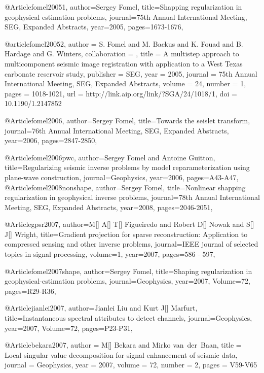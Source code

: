 @Article{fomel20051,
  author={Sergey Fomel},
  title={Shapping regularization in geophysical estimation problems},
  journal={75th Annual International Meeting, SEG, Expanded Abstracts},
  year=2005,
  pages={1673-1676},
}

@article{fomel20052,
author = {S. Fomel and M. Backus and K. Fouad and B. Hardage and G. Winters},
collaboration = {},
title = {A multistep approach to multicomponent seismic image
                  registration with application to a {W}est {T}exas
                  carbonate reservoir study},
publisher = {SEG},
year = {2005},
journal = {75th Annual International Meeting, SEG, Expanded Abstracts},
volume = {24},
number = {1},
pages = {1018-1021},
url = {http://link.aip.org/link/?SGA/24/1018/1},
doi = {10.1190/1.2147852}
}

@Article{fomel2006,
  author={Sergey Fomel},
  title={Towards the seislet transform},
  journal={76th Annual International Meeting, SEG, Expanded Abstracts},
  year=2006,
  pages={2847-2850},
}

@Article{fomel2006pwc,
  author={Sergey Fomel and Antoine Guitton},
  title={Regularizing seismic inverse problems by model reparameterization using plane-wave construction},
  journal={Geophysics},
  year=2006,
  pages={A43-A47},
}
@Article{fomel2008nonshape,
  author={Sergey Fomel},
  title={Nonlinear shapping regularization in geophysical inverse problems},
  journal={78th Annual International Meeting, SEG, Expanded Abstracts},
  year=2008,
  pages={2046-2051},
}

@Article{gpsr2007,
author={M[] A[] T[] Figueiredo and Robert D[] Nowak and S[] J[] Wright},
title={Gradient projection for sparse reconstruction: Application to compressed sensing and other inverse problems},
journal={IEEE journal of selected topics in signal processing},
volume=1,
year=2007,
pages={586 - 597},
}

@Article{fomel2007shape,
  author={Sergey Fomel},
  title={Shaping regularization in geophysical-estimation problems},
  journal={Geophysics},
  year=2007,
  Volume=72,
  pages={R29-R36},
}

@Article{jianlei2007,
  author={Jianlei Liu and Kurt J[] Marfurt},
  title={Instantaneous spectral attributes to detect channels},
  journal={Geophysics},
  year=2007,
  Volume=72,
  pages={P23-P31},
}




@Article{bekara2007,
  author = 	 {M[] Bekara and Mirko van~der~Baan},
  title = 	 {Local singular value decomposition for signal enhancement of seismic data},
  journal = 	 {Geophysics},
  year = 	 2007,
  volume = 	 72,
  number = 	 2,
  pages = 	 {V59-V65}}

